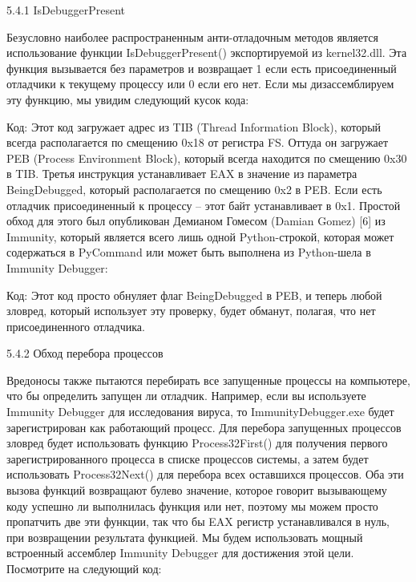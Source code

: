 \documentclass[12pt]{book}
\begin{document}
5.4.1 IsDebuggerPresent

Безусловно наиболее распространенным анти-отладочным методов является использование функции IsDebuggerPresent() экспортируемой из kernel32.dll. Эта функция вызывается без параметров и возвращает 1 если есть присоединенный отладчики к текущему процессу или 0 если его нет. Если мы дизассемблируем эту функцию, мы увидим следующий кусок кода:

Код:
Этот код загружает адрес из TIB (Thread Information Block), который всегда располагается по смещению 0x18 от регистра FS. Оттуда он загружает PEB (Process Environment Block), который всегда находится по смещению 0x30 в TIB. Третья инструкция устанавливает EAX в значение из параметра BeingDebugged, который располагается по смещению 0x2 в PEB. Если есть отладчик присоединенный к процессу – этот байт устанавливает в 0x1. Простой обход для этого был опубликован Демианом Гомесом (Damian Gomez) [6] из Immunity, который является всего лишь одной Python-строкой, которая может содержаться в PyCommand или может быть выполнена из Python-шела в Immunity Debugger:

Код:
Этот код просто обнуляет флаг BeingDebugged в PEB, и теперь любой зловред, который использует эту проверку, будет обманут, полагая, что нет присоединенного отладчика. 

5.4.2 Обход перебора процессов

Вредоносы также пытаются перебирать все запущенные процессы на компьютере, что бы определить запущен ли отладчик. Например, если вы используете Immunity Debugger для исследования вируса, то ImmunityDebugger.exe будет зарегистрирован как работающий процесс. Для перебора запущенных процессов зловред будет использовать функцию Process32First() для получения первого зарегистрированного процесса в списке процессов системы, а затем будет использовать Process32Next() для перебора всех оставшихся процессов. Оба эти вызова функций возвращают булево значение, которое говорит вызывающему коду успешно ли выполнилась функция или нет, поэтому мы можем просто пропатчить две эти функции, так что бы EAX регистр устанавливался в нуль, при возвращении результата функцией. Мы будем использовать мощный встроенный ассемблер Immunity Debugger для достижения этой цели. Посмотрите на следующий код:
\end{document}
